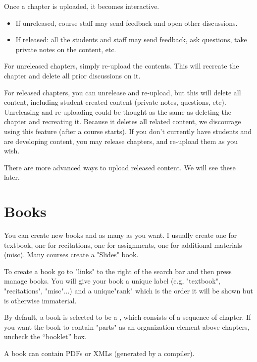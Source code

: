 \begin{gram}
Once a chapter is uploaded, it becomes interactive.

\begin{itemize}
\item
If unreleased, course staff may send feedback and open other discussions. 
\item
If released: all the students and staff may send feedback, ask questions, take private notes on the content, etc.
\end{itemize}
\end{gram}


\begin{gram}
For unreleased chapters, simply re-upload the contents.  This will
recreate the chapter and delete all prior discussions on it.  

For released chapters, you can unrelease and re-upload, but this will
delete all content, including student created content (private notes,
questions, etc). 
%
Unreleasing and re-uploading could be thought as the same as deleting the chapter and recreating it.
%
Because it deletes all related content, we discourage using this
feature (after a course starts).  If you don't currently have students and are developing content, you may release chapters, and re-upload them as you wish.

There are more advanced ways to upload released content. We will see
these later.
\end{gram}

\section{Books}
\label{guide:books}

\begin{gram}
You can create new books and as many as you want.  I usually create one for textbook, one for recitations, one for assignments, one for additional materials (misc).  Many courses create a "Slides" book.  

To create a book go to "links" to the right of the search bar and then press
manage books.  You will give your book a unique label (e.g,
"textbook", "recitations", "misc"...) and a unique"rank" which is the
order it will be shown but is otherwise immaterial.  

By default, a book is selected to be a , which
consists of a sequence of chapter.  
%
If you want the book to contain "parts" as an organization element
above chapters, uncheck the ``booklet'' box.  

A book can contain PDFs or XMLs (generated by a compiler).
\end{gram}

